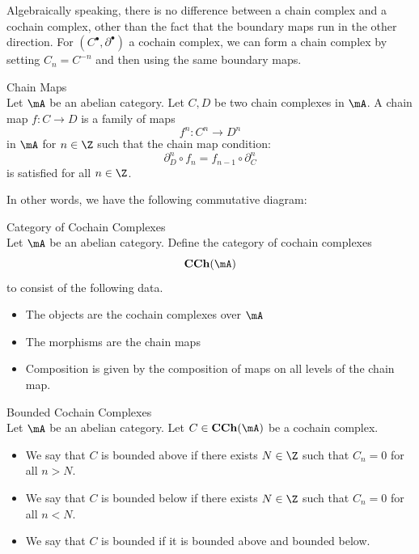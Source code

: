 \documentclass[a4paper]{article}
\begin{document}
Algebraically speaking, there is no difference between a chain complex and a cochain complex, other than the fact that the boundary maps run in the other direction. For $(C^\bullet,\partial^\bullet)$ a cochain complex, we can form a chain complex by setting $C_n=C^{-n}$ and then using the same boundary maps. 

\begin{defn}{Chain Maps}{}\\
Let $\mA$ be an abelian category. Let $C,D$ be two chain complexes in $\mA$. A chain map $f:C\to D$ is a family of maps $$f^n:C^n\to D^n$$ in $\mA$ for $n\in\Z$ such that the chain map condition: $$\partial_D^n\circ f_n=f_{n-1}\circ\partial_C^n$$ is satisfied for all $n\in\Z$. 
\end{defn}

In other words, we have the following commutative diagram: \\

\begin{defn}{Category of Cochain Complexes}{}\\
Let $\mA$ be an abelian category. Define the category of cochain complexes $$\bold{CCh}(\mA)$$ to consist of the following data. 
\begin{itemize}
\item The objects are the cochain complexes over $\mA$
\item The morphisms are the chain maps
\item Composition is given by the composition of maps on all levels of the chain map. 
\end{itemize}
\end{defn}

\begin{defn}{Bounded Cochain Complexes}{}\\
Let $\mA$ be an abelian category. Let $C\in\bold{CCh}(\mA)$ be a cochain complex. 
\begin{itemize}
\item We say that $C$ is bounded above if there exists $N\in\Z$ such that $C_n=0$ for all $n>N$. 
\item We say that $C$ is bounded below if there exists $N\in\Z$ such that $C_n=0$ for all $n<N$. 
\item We say that $C$ is bounded if it is bounded above and bounded below. 
\end{itemize}
\end{defn}
\end{document}
